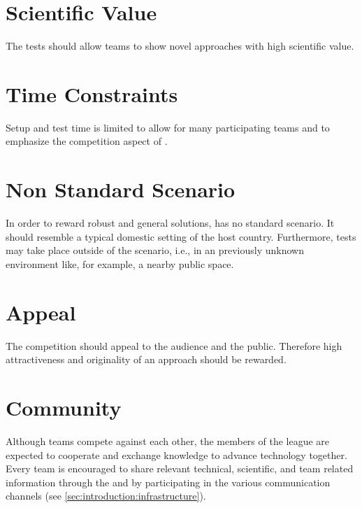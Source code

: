 \section{Scientific Value}
\label{sec:concepts:scientificvalue}
The tests should allow teams to show novel approaches with high scientific value.

\section{Time Constraints}
\label{sec:concepts:timeconstraints}
Setup and test time is limited to allow for many participating teams and to emphasize the competition aspect of \AtHome{}.

\section{Non Standard Scenario}
\label{sec:concepts:nonstandardscenario}
In order to reward robust and general solutions, \RoboCup\AtHome{} has no standard scenario. It should resemble a typical domestic setting of the host country. Furthermore, tests may take place outside of the scenario, i.e., in an previously unknown environment like, for example, a nearby public space.

\section{Appeal}
\label{sec:concepts:appeal}
The competition should appeal to the audience and the public. Therefore high attractiveness and originality of an approach should be rewarded.

\section{Community}
\label{sec:concepts:community}
Although teams compete against each other, the members of the \AtHome{} league are expected to cooperate and exchange knowledge to advance technology together. Every team is encouraged to share relevant technical, scientific, and team related information through the \TDP{} and by participating in the various communication channels (see \ref{sec:introduction:infrastructure}).


